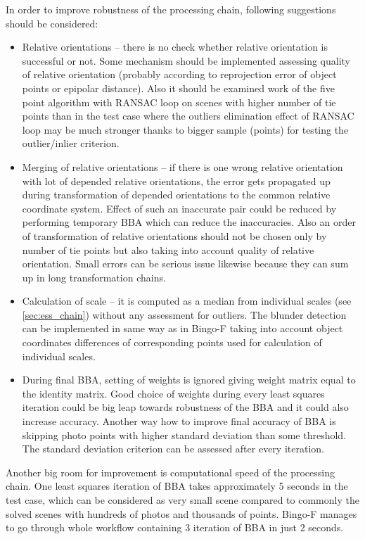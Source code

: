\documentclass[a4paper,12pt]{article}
\begin{document}
In order to improve robustness of the processing chain, following suggestions should be considered:
\begin{itemize}
\item Relative orientations -- there is no check whether relative orientation is successful or not. Some mechanism 
should be implemented assessing quality of relative orientation (probably according to reprojection error of object points or 
epipolar distance).
Also it should be examined work of the five point algorithm with RANSAC loop on scenes with higher number of tie points 
than in the test case where 
the outliers elimination effect of RANSAC loop may be much stronger thanks to bigger sample (points) for testing the
outlier/inlier criterion.
\item  Merging of relative orientations -- if there is one wrong relative orientation with lot of depended relative orientations,
the error gets propagated up during transformation of depended orientations to the common relative coordinate system. 
Effect of such an inaccurate pair could be 
reduced by performing  temporary BBA which can reduce the inaccuracies. Also an order of transformation of relative orientations 
 should not 
be chosen only by number of tie points but also taking into account quality of relative orientation.
Small errors can be serious issue likewise because they can
sum up in long transformation chains. 
\item Calculation of scale -- it is computed as a median from individual scales (see \ref{sec:ess_chain})
without any assessment for outliers. The blunder detection can be implemented in same way 
as in Bingo-F taking into account object coordinates differences of corresponding points used 
for calculation of individual scales.
\item During final BBA, setting of weights is ignored giving weight matrix equal to the identity matrix. 
Good choice of weights during every least squares iteration 
could be big leap towards robustness of the BBA and it could also increase accuracy. 
Another way how to improve final accuracy of BBA is skipping photo points with
higher standard deviation than some threshold. The standard deviation criterion can be assessed 
after every iteration.
\end{itemize}


Another big room for improvement is computational speed of the processing chain.
One least squares  iteration of BBA takes approximately 5 seconds in the test case, which can be 
considered as very small scene compared to commonly the solved
scenes with hundreds of photos and thousands of points. Bingo-F manages to go through whole workflow containing 
3 iteration of BBA in just 2 seconds.
\end{document}
